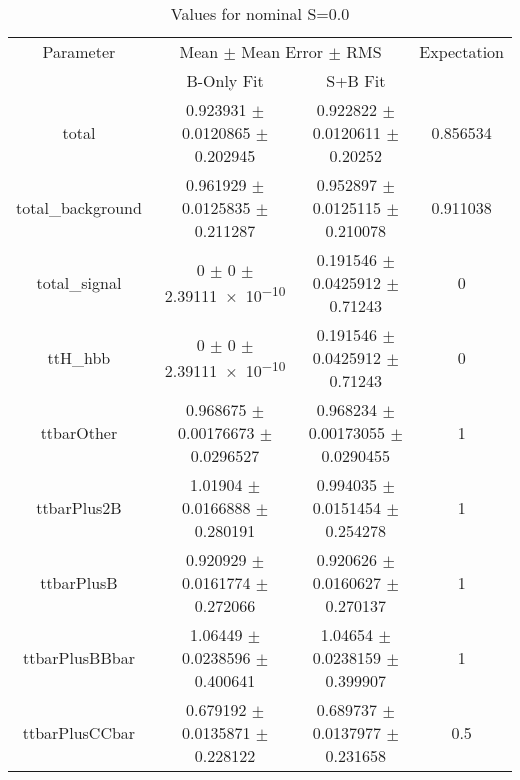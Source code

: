 \begin{table}
\centering
\caption{Values for nominal S=0.0}
\begin{tabular}{cccc}
\toprule
Parameter & \multicolumn{2}{c}{Mean $\pm$ Mean Error $\pm$ RMS} & Expectation\\
 & B-Only Fit & S+B Fit & \\
\midrule
total & \num{0.923931} $\pm$ \num{0.0120865} $\pm$ \num{0.202945} & \num{0.922822} $\pm$ \num{0.0120611} $\pm$ \num{0.20252} & \num{0.856534}\\
total\_background & \num{0.961929} $\pm$ \num{0.0125835} $\pm$ \num{0.211287} & \num{0.952897} $\pm$ \num{0.0125115} $\pm$ \num{0.210078} & \num{0.911038}\\
total\_signal & \num{0} $\pm$ \num{0} $\pm$ \num{2.39111e-10} & \num{0.191546} $\pm$ \num{0.0425912} $\pm$ \num{0.71243} & \num{0}\\
ttH\_hbb & \num{0} $\pm$ \num{0} $\pm$ \num{2.39111e-10} & \num{0.191546} $\pm$ \num{0.0425912} $\pm$ \num{0.71243} & \num{0}\\
ttbarOther & \num{0.968675} $\pm$ \num{0.00176673} $\pm$ \num{0.0296527} & \num{0.968234} $\pm$ \num{0.00173055} $\pm$ \num{0.0290455} & \num{1}\\
ttbarPlus2B & \num{1.01904} $\pm$ \num{0.0166888} $\pm$ \num{0.280191} & \num{0.994035} $\pm$ \num{0.0151454} $\pm$ \num{0.254278} & \num{1}\\
ttbarPlusB & \num{0.920929} $\pm$ \num{0.0161774} $\pm$ \num{0.272066} & \num{0.920626} $\pm$ \num{0.0160627} $\pm$ \num{0.270137} & \num{1}\\
ttbarPlusBBbar & \num{1.06449} $\pm$ \num{0.0238596} $\pm$ \num{0.400641} & \num{1.04654} $\pm$ \num{0.0238159} $\pm$ \num{0.399907} & \num{1}\\
ttbarPlusCCbar & \num{0.679192} $\pm$ \num{0.0135871} $\pm$ \num{0.228122} & \num{0.689737} $\pm$ \num{0.0137977} $\pm$ \num{0.231658} & \num{0.5}\\
\bottomrule
\end{tabular}
\end{table}
